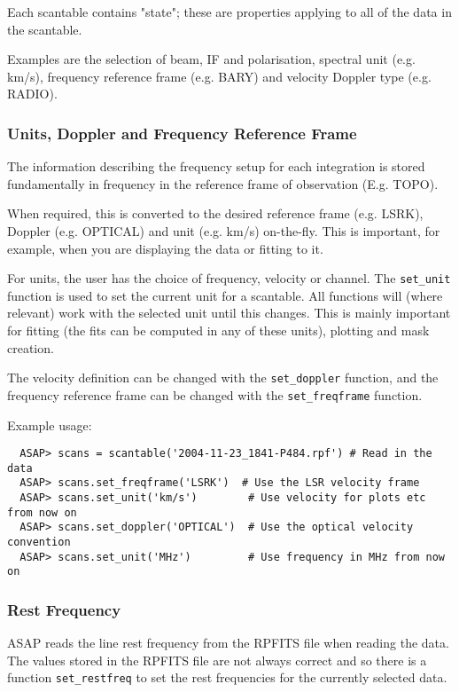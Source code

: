\documentclass[11pt]{article}
\newcommand{\cmd}[1]{{\tt #1}}
\begin{document}
Each scantable contains "state"; these are
properties applying to all of the data in the scantable.

Examples are the selection of beam, IF and polarisation,  spectral unit
(e.g. km/s), frequency reference frame (e.g. BARY) and velocity Doppler
type (e.g. RADIO).

\subsubsection{Units, Doppler and Frequency Reference Frame}

The information describing the frequency setup for each integration
is stored fundamentally in frequency in the reference frame
of observation (E.g. TOPO).

When required, this is converted to the desired reference frame
(e.g. LSRK), Doppler (e.g. OPTICAL) and unit (e.g. km/s) on-the-fly.
This is important, for example, when you are displaying the data or
fitting to it.

For units, the user has the choice of frequency, velocity or channel.
The \cmd{set\_unit} function is used to set the current unit for a
scantable. All functions will (where relevant) work with the selected
unit until this changes. This is mainly important for fitting (the fits
can be computed in any of these units), plotting and mask creation.

The velocity definition can be changed with the \cmd{set\_doppler}
function, and the frequency reference frame can be changed with the
\cmd{set\_freqframe} function.

Example usage:

\begin{verbatim}
  ASAP> scans = scantable('2004-11-23_1841-P484.rpf') # Read in the data
  ASAP> scans.set_freqframe('LSRK')  # Use the LSR velocity frame
  ASAP> scans.set_unit('km/s')        # Use velocity for plots etc from now on
  ASAP> scans.set_doppler('OPTICAL')  # Use the optical velocity convention
  ASAP> scans.set_unit('MHz')         # Use frequency in MHz from now on
\end{verbatim}


\subsubsection{Rest Frequency}

ASAP reads the line rest frequency
from the RPFITS file when reading the data. The values stored in the
RPFITS file are not always correct and so there is a function
\cmd{set\_restfreq} to set the rest frequencies for the currently
selected data.
\end{document}
